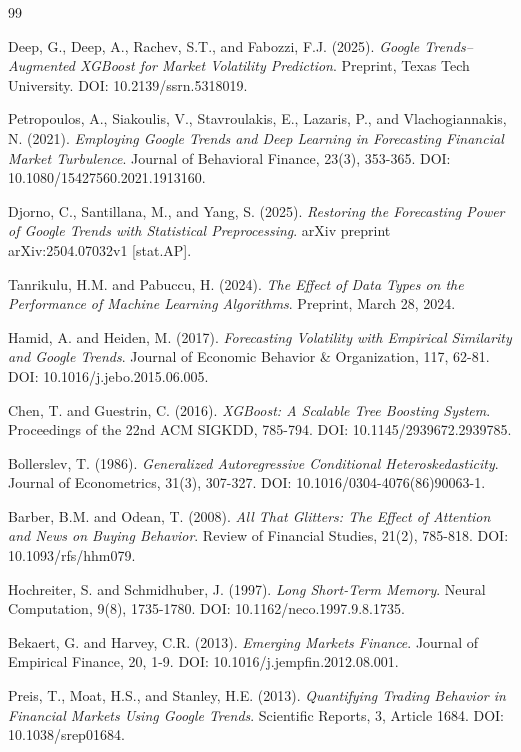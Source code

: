 \documentclass[12pt,a4paper]{article}
\begin{document}

\begin{thebibliography}{99}

Deep, G., Deep, A., Rachev, S.T., and Fabozzi, F.J. (2025).
\textit{Google Trends–Augmented XGBoost for Market Volatility Prediction}.
Preprint, Texas Tech University. DOI: 10.2139/ssrn.5318019.

Petropoulos, A., Siakoulis, V., Stavroulakis, E., Lazaris, P., and Vlachogiannakis, N. (2021).
\textit{Employing Google Trends and Deep Learning in Forecasting Financial Market Turbulence}.
Journal of Behavioral Finance, 23(3), 353-365. DOI: 10.1080/15427560.2021.1913160.

Djorno, C., Santillana, M., and Yang, S. (2025).
\textit{Restoring the Forecasting Power of Google Trends with Statistical Preprocessing}.
arXiv preprint arXiv:2504.07032v1 [stat.AP].

Tanrikulu, H.M. and Pabuccu, H. (2024).
\textit{The Effect of Data Types on the Performance of Machine Learning Algorithms}.
Preprint, March 28, 2024.

Hamid, A. and Heiden, M. (2017).
\textit{Forecasting Volatility with Empirical Similarity and Google Trends}.
Journal of Economic Behavior \& Organization, 117, 62-81. DOI: 10.1016/j.jebo.2015.06.005.

Chen, T. and Guestrin, C. (2016).
\textit{XGBoost: A Scalable Tree Boosting System}.
Proceedings of the 22nd ACM SIGKDD, 785-794. DOI: 10.1145/2939672.2939785.

Bollerslev, T. (1986).
\textit{Generalized Autoregressive Conditional Heteroskedasticity}.
Journal of Econometrics, 31(3), 307-327. DOI: 10.1016/0304-4076(86)90063-1.

Barber, B.M. and Odean, T. (2008).
\textit{All That Glitters: The Effect of Attention and News on Buying Behavior}.
Review of Financial Studies, 21(2), 785-818. DOI: 10.1093/rfs/hhm079.

Hochreiter, S. and Schmidhuber, J. (1997).
\textit{Long Short-Term Memory}.
Neural Computation, 9(8), 1735-1780. DOI: 10.1162/neco.1997.9.8.1735.

Bekaert, G. and Harvey, C.R. (2013).
\textit{Emerging Markets Finance}.
Journal of Empirical Finance, 20, 1-9. DOI: 10.1016/j.jempfin.2012.08.001.

Preis, T., Moat, H.S., and Stanley, H.E. (2013).
\textit{Quantifying Trading Behavior in Financial Markets Using Google Trends}.
Scientific Reports, 3, Article 1684. DOI: 10.1038/srep01684.


\end{thebibliography}
\end{document}
